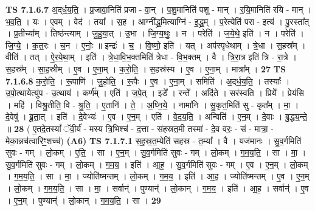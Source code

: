 \documentclass[17pt]{extarticle}
\begin{document}
                  \newline
                                \textbf{ TS 7.1.6.7} \newline
                  अ॒द्‌र्ध॒य॒ति॒ । प्र॒जावा॒निति॑ प्रजा - वा॒न् । प॒शु॒मानिति॑ पशु - मान् । र॒यि॒मानिति॑ रयि - मान् । भ॒व॒ति॒ । यः । ए॒वम् । वेद॑ । तया᳚ । स॒ह । आग्नी᳚द्ध्र॒मित्याग्नि॑ - इ॒द्ध्र॒म् । प॒रेत्येति॑ परा - इत्य॑ । पु॒रस्ता᳚त् । प्र॒तीच्या᳚म् । तिष्ठ॑न्त्याम् । जु॒हु॒या॒त् । उ॒भा । जि॒ग्य॒थुः॒ । न । परेति॑ । ज॒ये॒थे॒ इति॑ । न । परेति॑ । जि॒ग्ये॒ । क॒त॒रः । च॒न । ए॒नोः॒ ॥ इन्द्रः॑ । च॒ । वि॒ष्णो॒ इति॑ । यत् । अप॑स्पृधेथाम् । त्रे॒धा । स॒हस्र᳚म् । वीति॑ । तत् । ऐ॒र॒ये॒था॒म् । इति॑ । त्रे॒धा॒वि॒भ॒क्तमिति॑ त्रेधा - वि॒भ॒क्तम् । वै । त्रि॒रा॒त्र इति॑ त्रि - रा॒त्रे । स॒हस्र᳚म् । सा॒ह॒स्रीम् । ए॒व । ए॒ना॒म् । क॒रो॒ति॒ । स॒हस्र॑स्य । ए॒व । ए॒ना॒म् । मात्रा᳚म् । \textbf{  27} \newline
                  \newline
                                \textbf{ TS 7.1.6.8} \newline
                  क॒रो॒ति॒ । रू॒पाणि॑ । जु॒हो॒ति॒ । रू॒पैः । ए॒व । ए॒ना॒म् । समिति॑ । अ॒द्‌र्ध॒य॒ति॒ । तस्याः᳚ ।      उ॒पो॒त्थायेत्यु॑प - उ॒त्थाय॑ । कर्ण᳚म् । एति॑ । ज॒पे॒त् । इडे᳚ । रन्ते᳚ । अदि॑ते । सर॑स्वति । प्रिये᳚ । प्रेय॑सि । महि॑ । विश्रु॒तीति॒ वि - श्रु॒ति॒ । ए॒तानि॑ । ते॒ । अ॒घ्नि॒ये॒ । नामा॑नि । सु॒कृत॒मिति॑ सु - कृत᳚म् । मा॒ । दे॒वेषु॑ । ब्रू॒ता॒त् । इति॑ । दे॒वेभ्यः॑ । ए॒व । ए॒न॒म् । एति॑ । वे॒द॒य॒ति॒ । अन्विति॑ । ए॒न॒म् । दे॒वाः । बु॒द्ध्य॒न्ते॒ ॥ \textbf{  28 } \newline
                  \newline
                      ( ए॒तदे॒तस्यां᳚ ॅवी॒र्य॑ - मस्य त्रि॒भिश्च॑ - द॒त्ता - स॑हस्रत॒मी तस्मा॑ - दे॒व वरः॒ - सं - मात्रा॒ - मेका॒न्नच॑त्वारिꣳ॒॒शच्च॑)  \textbf{(A6)} \newline \newline
                                \textbf{ TS 7.1.7.1} \newline
                  स॒ह॒स्र॒त॒म्येति॑ सहस्र - त॒म्या᳚ । वै । यज॑मानः । सु॒व॒र्गमिति॑ सुवः - गम् । लो॒कम् । ए॒ति॒ । सा । ए॒न॒म् । सु॒व॒र्गमिति॑ सुवः - गम् । लो॒कम् । ग॒म॒य॒ति॒ । सा । मा॒ । सु॒व॒र्गमिति॑ सुवः - गम् । लो॒कम् । ग॒म॒य॒ । इति॑ । आ॒ह॒ । सु॒व॒र्गमिति॑ सुवः - गम् । ए॒व । ए॒न॒म् । लो॒कम् । ग॒म॒य॒ति॒ । सा । मा॒ । ज्योति॑ष्मन्तम् । लो॒कम् । ग॒म॒य॒ । इति॑ । आ॒ह॒ । ज्योति॑ष्मन्तम् । ए॒व । ए॒न॒म् । लो॒कम् । ग॒म॒य॒ति॒ । सा । मा॒ । सर्वान्॑ । पुण्यान्॑ । लो॒कान् । ग॒म॒य॒ । इति॑ । आ॒ह॒ । सर्वान्॑ । ए॒व । ए॒न॒म् । पुण्यान्॑ । लो॒कान् । ग॒म॒य॒ति॒ । सा । \textbf{  29} \newline
\end{document}
